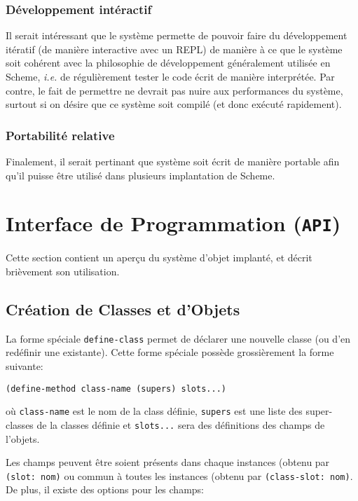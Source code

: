     \subsubsection{Développement intéractif}
      Il serait intéressant que le système permette de pouvoir faire
      du développement itératif (de manière interactive avec un REPL)
      de manière à ce que le système soit cohérent avec la philosophie
      de développement généralement utilisée en Scheme, \textit{i.e.}
      de régulièrement tester le code écrit de manière interprétée.
      Par contre, le fait de permettre ne devrait pas nuire aux
      performances du système, surtout si on désire que ce système
      soit compilé (et donc exécuté rapidement).

    \subsubsection{Portabilité relative}
      Finalement, il serait pertinant que système soit écrit de
      manière portable afin qu'il puisse être utilisé dans plusieurs
      implantation de Scheme. 


  \section{Interface de Programmation (\texttt{API})}
    \label{api}

    Cette section contient un aperçu du système d'objet implanté, et
    décrit brièvement son utilisation.
  
    \subsection{Création de Classes et d'Objets}
      La forme spéciale \texttt{define-class} permet de déclarer une
      nouvelle classe (ou d'en redéfinir une existante). Cette forme
      spéciale possède grossièrement la forme suivante:

      \begin{lstlisting}
(define-method class-name (supers) slots...)
      \end{lstlisting}

      où \texttt{class-name} est le nom de la class définie,
      \texttt{supers} est une liste des super-classes de la classes
      définie et \texttt{slots...} sera des définitions des champs de
      l'objets.

      Les champs peuvent être soient présents dans chaque instances
      (obtenu par \texttt{(slot: nom)} ou commun à toutes les
      instances (obtenu par \texttt{(class-slot: nom)}. De plus, il
      existe des options pour les champs:
      
